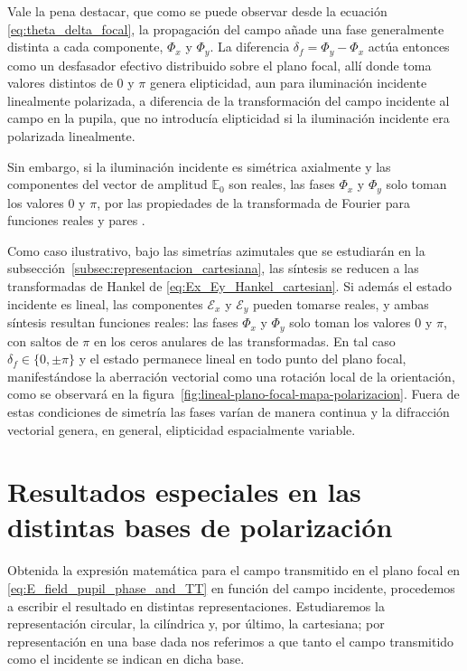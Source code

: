 Vale la pena destacar, que como se puede observar desde la 
ecuación \eqref{eq:theta_delta_focal}, la propagación del 
campo añade una fase generalmente distinta a cada componente, $\Phi_x$ y $\Phi_y$. La
diferencia $\delta_f=\Phi_y-\Phi_x$ actúa entonces como un desfasador efectivo
distribuido sobre el plano focal, allí donde toma valores distintos de $0$ y
$\pi$ genera elipticidad, aun para iluminación incidente linealmente
polarizada, a diferencia de la transformación del campo incidente al campo en la
pupila, que no introducía elipticidad si la iluminación incidente era polarizada
linealmente.

Sin embargo, si la iluminación incidente es simétrica axialmente y las componentes 
del vector de amplitud $\mathbb E_0$ son reales, las fases $\Phi_x$ y $\Phi_y$ solo toman 
los valores $0$ y $\pi$, por las propiedades de 
la transformada de Fourier para funciones reales y pares \cite{arfken2013}.


Como caso ilustrativo, bajo las simetrías azimutales que se estudiarán en la
subsección~\ref{subsec:representacion_cartesiana}, las síntesis se reducen a
las transformadas de Hankel de \eqref{eq:Ex_Ey_Hankel_cartesian}. Si además el
estado incidente es lineal, las componentes $\mathscr E_x$ y $\mathscr E_y$
pueden tomarse reales, y ambas síntesis resultan funciones reales: las fases
$\Phi_x$ y $\Phi_y$ solo toman los valores $0$ y $\pi$, con saltos de $\pi$ en
los ceros anulares de las transformadas. En tal caso $\delta_f\in\{0,\pm\pi\}$
y el estado permanece lineal en todo punto del plano focal, manifestándose la
aberración vectorial como una rotación local de la orientación, como se
observará en la figura~\ref{fig:lineal-plano-focal-mapa-polarizacion}. Fuera de
estas condiciones de simetría las fases varían de manera continua y la
difracción vectorial genera, en general, elipticidad espacialmente variable.

\section{Resultados especiales en las distintas bases de polarización}

Obtenida la expresión matemática para el campo transmitido en el plano focal en \eqref{eq:E_field_pupil_phase_and_TT} en función del campo incidente, procedemos a escribir el resultado en distintas representaciones. Estudiaremos la representación circular, la cilíndrica y, por último, la cartesiana; por representación en una base dada nos referimos a que tanto el campo transmitido como el incidente se indican en dicha base.

